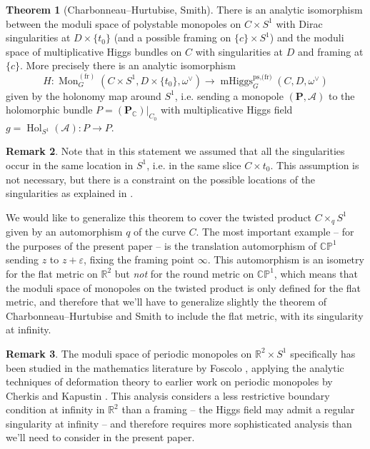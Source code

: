\documentclass[11pt, oneside, reqno]{amsart}
\theoremstyle{definition} \newtheorem{definition}{Definition}[section]
\newtheorem{theorem}[definition]{Theorem}
\theoremstyle{definition} \newtheorem{remark}[definition]{Remark}
\theoremstyle{definition} \newtheorem{remarks}[definition]{Remarks}
\theoremstyle{definition} \newtheorem{question}[definition]{Question}
\theoremstyle{definition} \newtheorem*{note}{Note}
\theoremstyle{definition} \newtheorem{example}[definition]{Example}
\theoremstyle{definition} \newtheorem{examples}[definition]{Examples}
\newcommand{\bb}[1]{\mathbb{#1}}
\newcommand{\mc}[1]{\mathcal{#1}}
\newcommand{\bo}[1]{\boldsymbol{#1}}
\newcommand{\CC}{\mathbb{C}}
\newcommand{\RR}{\mathbb{R}}
\newcommand{\eps}{\varepsilon}
\DeclareMathOperator{\mhiggs}{mHiggs}
\DeclareMathOperator{\mon}{Mon}
\DeclareMathOperator{\Hol}{Hol}
\newcommand{\fr}{\mathrm{fr}}
\begin{document}
\begin{theorem}[Charbonneau--Hurtubise, Smith] \label{CHS_thm}
There is an analytic isomorphism between the moduli space of polystable monopoles on $C \times S^1$ with Dirac singularities at $D \times \{t_0\}$ (and a possible framing on $\{c\} \times S^1$) and the moduli space of multiplicative Higgs bundles on $C$ with singularities at $D$ and framing at $\{c\}$.  More precisely there is an analytic isomorphism
\[H \colon \mon^{(\fr)}_G(C \times S^1, D \times \{t_0\}, \omega^\vee) \to \mhiggs_G^{\text{ps,(fr)}}(C, D, \omega^\vee)\]
given by the holonomy map around $S^1$, i.e. sending a monopole $(\bo P, \mc A)$ to the holomorphic bundle $P = (\bo P_\CC)|_{C_0}$ with multiplicative Higgs field $g = \Hol_{S^1}(\mc A) \colon P \to P$.
\end{theorem}

\begin{remark}
Note that in this statement we assumed that all the singularities occur in the same location in $S^1$, i.e. in the same slice $C \times {t_0}$.  This assumption is not necessary, but there is a constraint on the possible locations of the singularities as explained in \cite[Proposition 3.5]{CharbonneauHurtubise}.  
\end{remark}

We would like to generalize this theorem to cover the twisted product $C \times_q S^1$ given by an automorphism $q$ of the curve $C$.  The most important example -- for the purposes of the present paper -- is the translation automorphism of $\bb{CP}^1$ sending $z$ to $z + \eps$, fixing the framing point $\infty$.  This automorphism is an isometry for the flat metric on $\RR^2$ but \emph{not} for the round metric on $\bb{CP}^1$, which means that the moduli space of monopoles on the twisted product is only defined for the flat metric, and therefore that we'll have to generalize slightly the theorem of Charbonneau--Hurtubise and Smith to include the flat metric, with its singularity at infinity.

\begin{remark}
The moduli space of periodic monopoles on $\RR^2 \times S^1$ specifically has been studied in the mathematics literature by Foscolo \cite{FoscoloDef} , applying the analytic techniques of deformation theory to earlier work on periodic monopoles by Cherkis and Kapustin \cite{CherkisKapustin1, CherkisKapustin2}. This analysis considers a less restrictive boundary condition at infinity in $\RR^2$ than a framing -- the Higgs field may admit a regular singularity at infinity -- and therefore requires more sophisticated analysis than we'll need to consider in the present paper.
\end{remark}
\end{document}
